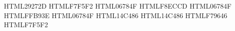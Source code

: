 %
%

\definecolor{unalDk1}  {HTML}{29272D}
\definecolor{unalLt1}  {HTML}{F7F5F2}
\definecolor{unalDk2}  {HTML}{06784F}   %
\definecolor{unalLt2}  {HTML}{F8ECCD}
\definecolor{unalAcc1} {HTML}{06784F}   %
\definecolor{unalAcc2} {HTML}{FFB93E}   %
\definecolor{unalAcc3} {HTML}{06784F}   %
\definecolor{unalAcc4} {HTML}{14C486}   %
\definecolor{unalAcc5} {HTML}{14C486}   %
\definecolor{unalAcc6} {HTML}{F79646}   %
\definecolor{unalBg2}  {HTML}{F7F5F2}   %
